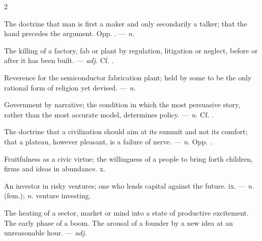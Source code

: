 \begin{multicols}{2}

 The doctrine that man is first a maker and only secondarily a talker; that the hand precedes the argument. Opp. . —  \textit{n.}

 The killing of a factory, fab or plant by regulation, litigation or neglect, before or after it has been built. —  \textit{adj.} Cf. .

 Reverence for the semiconductor fabrication plant; held by some to be the only rational form of religion yet devised.   —  \textit{n.}

 Government by narrative; the condition in which the most persuasive story, rather than the most accurate model, determines policy.  —  \textit{n.} Cf. .

 The doctrine that a civilization should aim at its summit and not its comfort; that a plateau, however pleasant, is a failure of nerve. —  \textit{n.} Opp. .

 Fruitfulness as a civic virtue; the willingness of a people to bring forth children, firms and ideas in abundance.   x.

 An investor in risky ventures; one who lends capital against the future.   ix. —  \textit{n.} (fem.);  \textit{n.} venture investing.

 The heating of a sector, market or mind into a state of productive excitement.  The early phase of a boom.  The arousal of a founder by a new idea at an unreasonable hour. —  \textit{adj.}


\end{multicols}
